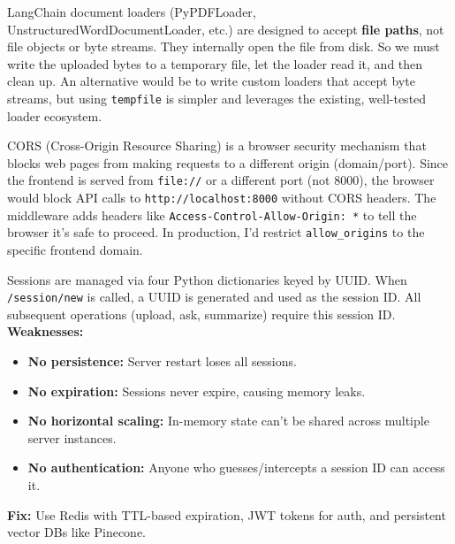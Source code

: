 \documentclass[12pt,a4paper]{article}
\begin{document}
\begin{interviewbox}
\end{interviewbox}
\begin{answerbox}
LangChain document loaders (PyPDFLoader, UnstructuredWordDocumentLoader, etc.) are designed to accept \textbf{file paths}, not file objects or byte streams. They internally open the file from disk. So we must write the uploaded bytes to a temporary file, let the loader read it, and then clean up. An alternative would be to write custom loaders that accept byte streams, but using \texttt{tempfile} is simpler and leverages the existing, well-tested loader ecosystem.
\end{answerbox}

\begin{interviewbox}
\end{interviewbox}
\begin{answerbox}
CORS (Cross-Origin Resource Sharing) is a browser security mechanism that blocks web pages from making requests to a different origin (domain/port). Since the frontend is served from \texttt{file://} or a different port (not 8000), the browser would block API calls to \texttt{http://localhost:8000} without CORS headers. The middleware adds headers like \texttt{Access-Control-Allow-Origin: *} to tell the browser it's safe to proceed. In production, I'd restrict \texttt{allow\_origins} to the specific frontend domain.
\end{answerbox}

\begin{interviewbox}
\end{interviewbox}
\begin{answerbox}
Sessions are managed via four Python dictionaries keyed by UUID. When \texttt{/session/new} is called, a UUID is generated and used as the session ID. All subsequent operations (upload, ask, summarize) require this session ID. \textbf{Weaknesses:}
\begin{itemize}
  \item \textbf{No persistence:} Server restart loses all sessions.
  \item \textbf{No expiration:} Sessions never expire, causing memory leaks.
  \item \textbf{No horizontal scaling:} In-memory state can't be shared across multiple server instances.
  \item \textbf{No authentication:} Anyone who guesses/intercepts a session ID can access it.
\end{itemize}
\textbf{Fix:} Use Redis with TTL-based expiration, JWT tokens for auth, and persistent vector DBs like Pinecone.
\end{answerbox}
\end{document}
